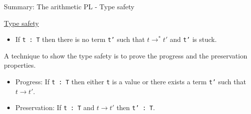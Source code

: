 \documentclass[table]{beamer}
\begin{document}
\begin{frame}[t]{Summary: The arithmetic PL - Type safety} 

\underline{Type safety}

\vspace{5pt}

\begin{itemize}
\item If \texttt{t : T} then there is no term \texttt{t'} such that $t \rightarrow^* t'$ and \texttt{t'} is stuck.
\end{itemize}

\vspace{10pt}

A technique to show the type safety is to prove the progress and the preservation properties.
\begin{itemize}
\item Progress: If \texttt{t : T} then either \texttt{t} is a value or there exists a term \texttt{t'} such that $t \rightarrow t'$.
\item Preservation: If \texttt{t : T} and $t \rightarrow t'$ then \texttt{t' : T}.
\end{itemize}



\end{frame}
\end{document}
